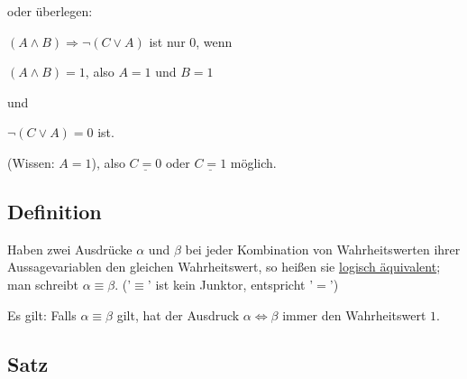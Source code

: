 \documentclass[a4paper, 12pt, twoside] {article}
\begin{document}
oder überlegen:

$(A \wedge B) \Rightarrow \neg  (C \lor A)$ ist nur 0, wenn

\qquad $(A \wedge B) = 1$, also $A = 1$ und $B = 1$

und

\qquad $\neg(C \lor A) = 0$ ist.

(Wissen: $A = 1$), also $\underline{C = 0}$ oder $ \underline{C = 1}$ möglich. 

\subsection[Definition (logische Äquivalenz)]{Definition} %

Haben zwei Ausdrücke $\alpha$ und $\beta$ bei jeder Kombination von Wahrheitswerten ihrer Aussagevariablen den gleichen Wahrheitswert, so heißen sie \underline{logisch äquivalent}; man schreibt $\alpha \equiv \beta$. ('$\equiv$' ist kein Junktor, entspricht '$=$')

Es gilt: Falls $\alpha \equiv \beta$ gilt, hat der Ausdruck $\alpha \Leftrightarrow \beta$ immer den Wahrheitswert $1$.

\subsection[Satz (Eigenschaften logischer Aussagen)]{Satz} %
\end{document}
